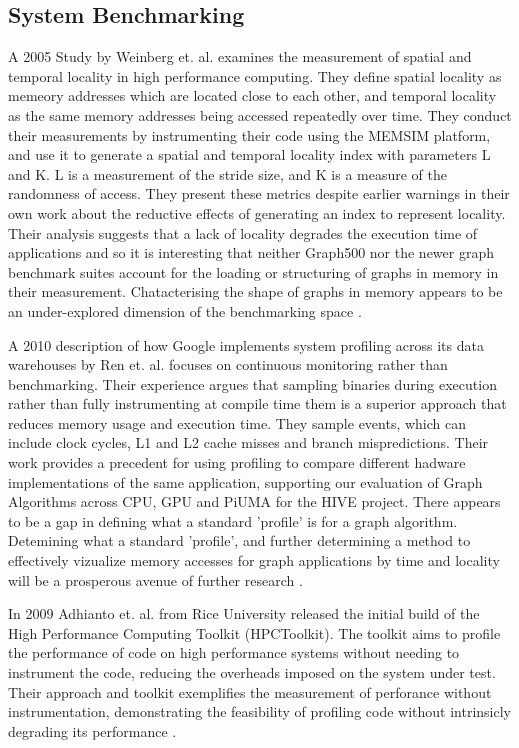 \documentclass[sigconf,authordraft]{acmart}
\begin{document}
\subsection{System Benchmarking}

\par{A 2005 Study by Weinberg et. al. examines the measurement of spatial and temporal locality in high performance computing. 
They define spatial locality as memeory addresses which are located close to each other, and temporal locality as the same memory addresses being accessed repeatedly over time. 
They conduct their measurements by instrumenting their code using the MEMSIM platform, and use it to generate a spatial and temporal locality index with parameters L and K. 
L is a measurement of the stride size, and K is a measure of the randomness of access. 
They present these metrics despite earlier warnings in their own work about the reductive effects of generating an index to represent locality. 
Their analysis suggests that a lack of locality degrades the execution time of applications and so it is interesting that neither Graph500 nor the newer graph benchmark suites account for the loading or structuring of graphs in memory in their measurement. 
Chatacterising the shape of graphs in memory appears to be an under-explored dimension of the benchmarking space \cite{Weinberg2005}.}

\par{A 2010 description of how Google implements system profiling across its data warehouses by Ren et. al. focuses on continuous monitoring rather than benchmarking.  
Their experience argues that sampling binaries during execution rather than fully instrumenting at compile time them is a superior approach that reduces memory usage and execution time. 
They sample events, which can include clock cycles, L1 and L2 cache misses and branch mispredictions. 
Their work provides a precedent for using profiling to compare different hadware implementations of the same application, supporting our evaluation of Graph Algorithms across CPU, GPU and PiUMA for the HIVE project. 
There appears to be a gap in defining what a standard 'profile' is for a graph algorithm. 
Detemining what a standard 'profile', and further determining a method to effectively vizualize memory accesses for graph applications by time and locality will be a prosperous avenue of further research \cite{Ren2010}.}

\par{In 2009 Adhianto et. al. from Rice University released the initial build of the High Performance Computing Toolkit (HPCToolkit). 
The toolkit aims to profile the performance of code on high performance systems without needing to instrument the code, reducing the overheads imposed on the system under test. 
Their approach and toolkit exemplifies the measurement of perforance without instrumentation, demonstrating the feasibility of profiling code without intrinsicly degrading its performance \cite{Adhianto2010}.}
\end{document}
